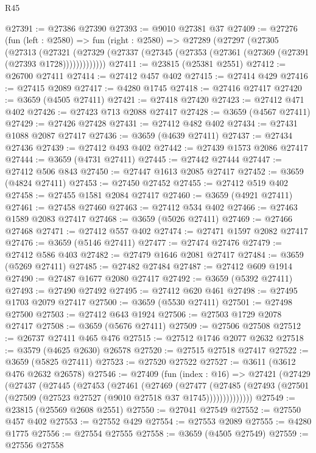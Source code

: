 \begin{lexlean}{R45}
\begin{coremodule}
@27391 := @27386 @27390
@27393 := @9010 @27381 @37
@27409 := @27276
    (fun (left : @2580) =>
    fun (right : @2580) =>
    @27289
      (@27297
        (@27305
          (@27313
            (@27321
              (@27329 (@27337 (@27345 (@27353 (@27361 (@27369 (@27391 (@27393 @1728)))))))))))))
@27411 := @23815 (@25381 @2551)
@27412 := @26700 @27411
@27414 := @27412 @457 @402
@27415 := @27414 @429
@27416 := @27415 @2089
@27417 := @4280 @1745
@27418 := @27416 @27417
@27420 := @3659 (@4505 @27411)
@27421 := @27418 @27420
@27423 := @27412 @471 @402
@27426 := @27423 @713 @2088 @27417
@27428 := @3659 (@4567 @27411)
@27429 := @27426 @27428
@27431 := @27412 @482 @402
@27434 := @27431 @1088 @2087 @27417
@27436 := @3659 (@4639 @27411)
@27437 := @27434 @27436
@27439 := @27412 @493 @402
@27442 := @27439 @1573 @2086 @27417
@27444 := @3659 (@4731 @27411)
@27445 := @27442 @27444
@27447 := @27412 @506 @843
@27450 := @27447 @1613 @2085 @27417
@27452 := @3659 (@4824 @27411)
@27453 := @27450 @27452
@27455 := @27412 @519 @402
@27458 := @27455 @1581 @2084 @27417
@27460 := @3659 (@4921 @27411)
@27461 := @27458 @27460
@27463 := @27412 @534 @402
@27466 := @27463 @1589 @2083 @27417
@27468 := @3659 (@5026 @27411)
@27469 := @27466 @27468
@27471 := @27412 @557 @402
@27474 := @27471 @1597 @2082 @27417
@27476 := @3659 (@5146 @27411)
@27477 := @27474 @27476
@27479 := @27412 @586 @403
@27482 := @27479 @1646 @2081 @27417
@27484 := @3659 (@5269 @27411)
@27485 := @27482 @27484
@27487 := @27412 @609 @1914
@27490 := @27487 @1677 @2080 @27417
@27492 := @3659 (@5392 @27411)
@27493 := @27490 @27492
@27495 := @27412 @620 @461
@27498 := @27495 @1703 @2079 @27417
@27500 := @3659 (@5530 @27411)
@27501 := @27498 @27500
@27503 := @27412 @643 @1924
@27506 := @27503 @1729 @2078 @27417
@27508 := @3659 (@5676 @27411)
@27509 := @27506 @27508
@27512 := @26737 @27411 @465 @476
@27515 := @27512 @1746 @2077 @2632
@27518 := @3579 (@4625 @2630) @26578
@27520 := @27515 @27518 @27417
@27522 := @3659 (@5825 @27411)
@27523 := @27520 @27522
@27527 := @3611 (@3612 @476 @2632 @26578)
@27546 := @27409
    (fun (index : @16) =>
    @27421
      (@27429
        (@27437
          (@27445
            (@27453
              (@27461
                (@27469
                  (@27477
                    (@27485
                      (@27493 (@27501 (@27509 (@27523 @27527 (@9010 @27518 @37 @1745))))))))))))))
@27549 := @23815 (@25569 @2608 @2551)
@27550 := @27041 @27549
@27552 := @27550 @457 @402
@27553 := @27552 @429
@27554 := @27553 @2089
@27555 := @4280 @1775
@27556 := @27554 @27555
@27558 := @3659 (@4505 @27549)
@27559 := @27556 @27558

\end{coremodule}
\end{lexlean}
